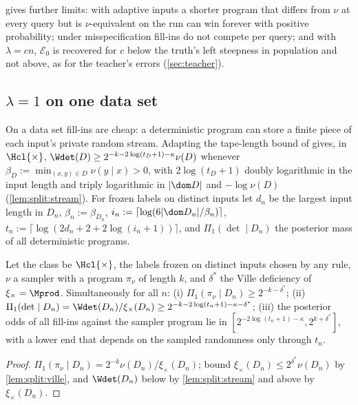  gives further limits: with adaptive inputs a shorter program that differs from $\nu$ at every query but is $\nu$-equivalent on the run can win forever with positive probability; under misspecification fill-ins do not compete per query; and with $\lambda=cn$, $\mathcal E_0$ is recovered for $c$ below the truth's left steepness in population and not above, as for the teacher's errors (\cref{sec:teacher}).

\subsection{\texorpdfstring{$\lambda=1$}{lambda=1} on one data set}\label{sec:split:lambda1}

On a data set fill-ins are cheap: a deterministic program can store a finite piece of each input's private random stream. Adapting the tape-length bound of \citet[Proposition~4.6(a)]{claudeSFI2026fundamentals} %
gives, in $\Hcl{\times}$, $\Wdet(D)\ge2^{-k-2\log(t_D+1)-\kappa}\nu(D)$ whenever $\beta_D:=\min_{(x,y)\in D}\nu(y\mid x)>0$, with $2\log(t_D+1)$ doubly logarithmic in the input length and triply logarithmic in $|\dom D|$ and $-\log\nu(D)$ (\cref{lem:split:stream}). For frozen labels on distinct inputs let $d_n$ be the largest input length in $D_n$, $\beta_n:=\beta_{D_n}$, $i_n:=\lceil\log(6|\dom D_n|/\beta_n)\rceil$, $t_n:=\lceil\log(2d_n+2+2\log(i_n+1))\rceil$, and $\Pi_1(\det\mid D_n)$ the posterior mass of all deterministic programs.

\begin{theorem}[Solomonoff's per-query solution at $\lambda=1$]\label{thm:split:lambda1}
Let the class be $\Hcl{\times}$, the labels frozen on distinct inputs chosen by any rule, $\nu$ a sampler with a program $\pi_\nu$ of length $k$, and $\delta^*$ the Ville deficiency of $\xi_\times=\Mprod$. Simultaneously for all $n$:
(i) $\Pi_1(\pi_\nu\mid D_n)\ge2^{-k-\delta^*}$;
(ii) $\Pi_1(\det\mid D_n)=\Wdet(D_n)/\xi_\times(D_n)\ge2^{-k-2\log(t_n+1)-\kappa-\delta^*}$;
(iii) the posterior odds of all fill-ins against the sampler program lie in $[2^{-2\log(t_n+1)-\kappa},2^{k+\delta^*}]$, with a lower end that depends on the sampled randomness only through $t_n$.
\end{theorem}

\begin{proof}
$\Pi_1(\pi_\nu\mid D_n)=2^{-k}\nu(D_n)/\xi_\times(D_n)$; bound $\xi_\times(D_n)\le2^{\delta^*}\nu(D_n)$ by \cref{lem:split:ville}, and $\Wdet(D_n)$ below by \cref{lem:split:stream} and above by $\xi_\times(D_n)$.
\end{proof}

